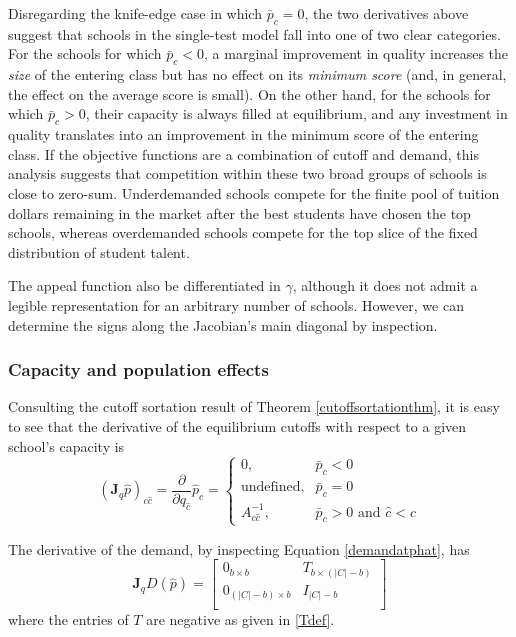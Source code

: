 \documentclass[12pt]{article}
\theoremstyle{definition}
\begin{document}
Disregarding the knife-edge case in which $\bar p_c = 0$, the two derivatives above suggest that schools in the single-test model fall into one of two clear categories. For the schools for which $\bar p_c < 0$, a marginal improvement in quality increases the \emph{size} of the entering class but has no effect on its \emph{minimum score} (and, in general, the effect on the average score is small). On the other hand, for the schools for which $\bar p_c > 0$, their capacity is always filled at equilibrium, and any investment in quality translates into an improvement in the minimum score of the entering class. If the objective functions are a combination of cutoff and demand, this analysis suggests that competition within these two broad groups of schools is close to zero-sum. Underdemanded schools compete for the finite pool of tuition dollars remaining in the market after the best students have chosen the top schools, whereas overdemanded schools compete for the top slice of the fixed distribution of student talent.

The appeal function also be differentiated in $\gamma$, although it does not admit a legible representation for an arbitrary number of schools. However, we can determine the signs along the Jacobian's main diagonal by inspection.


\subsubsection{Capacity and population effects}
Consulting the cutoff sortation result of Theorem \ref{cutoffsortationthm}, it is easy to see that the derivative of the equilibrium cutoffs with respect to a given school's capacity is
\begin{equation}\label{jac-q-p}
\left(\mathbf{J}_q \hat p\right)_{c\hat c} =
\frac{\partial}{\partial q_{\hat c}} \hat p_c = \begin{cases}
0, & \bar p_c < 0 \\
\text{undefined}, & \bar p_c = 0 \\
A^{-1}_{c \hat c}, & \bar p_c > 0 \text{ and }\hat c < c 
\end{cases}
\end{equation}

The derivative of the demand, by inspecting Equation \eqref{demandatphat}, has
\begin{equation}\mathbf{J}_q D(\hat p) =
\begin{bmatrix}
0_{b \times b} & T_{b \times (|C| - b)} \\
0_{(|C| - b) \times b} & I_{|C| - b} \\
\end{bmatrix} 
\end{equation}
where the entries of $T$ are negative as given in \eqref{Tdef}.
\end{document}
